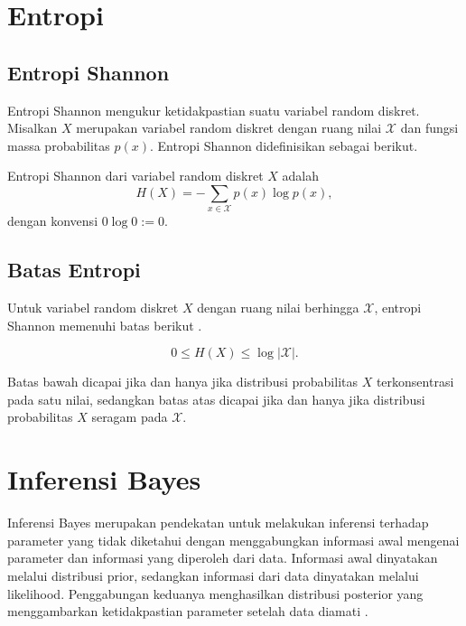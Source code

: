\section{Entropi}
\label{sec:entropi}

\subsection{Entropi Shannon}
\label{subsec:entropishannon}

Entropi Shannon mengukur ketidakpastian suatu variabel random
diskret. Misalkan $X$ merupakan variabel random diskret dengan
ruang nilai $\mathcal{X}$ dan fungsi massa probabilitas $p(x)$.
Entropi Shannon didefinisikan sebagai berikut.

\begin{definisi}
\label{def:entropishannon}
Entropi Shannon dari variabel random diskret $X$ adalah
\begin{equation}
    H(X)=-\sum_{x\in\mathcal{X}}p(x)\log p(x),
    \label{eq:entropishannon}
\end{equation}
dengan konvensi $0\log 0:=0$.
\end{definisi}

\subsection{Batas Entropi}
\label{subsec:batasentropi}

Untuk variabel random diskret $X$ dengan ruang nilai berhingga
$\mathcal{X}$, entropi Shannon memenuhi batas berikut
\citep{cover}.

\begin{equation}
    0\leq H(X)\leq\log|\mathcal{X}|.
    \label{eq:batasentropi}
\end{equation}

Batas bawah dicapai jika dan hanya jika distribusi probabilitas
$X$ terkonsentrasi pada satu nilai, sedangkan batas atas dicapai
jika dan hanya jika distribusi probabilitas $X$ seragam pada
$\mathcal{X}$.


\section{Inferensi Bayes}
\label{sec:bayes}

Inferensi Bayes merupakan pendekatan untuk melakukan inferensi terhadap
parameter yang tidak diketahui dengan menggabungkan informasi awal
mengenai parameter dan informasi yang diperoleh dari data. Informasi
awal dinyatakan melalui distribusi prior, sedangkan informasi dari data
dinyatakan melalui likelihood. Penggabungan keduanya menghasilkan
distribusi posterior yang menggambarkan ketidakpastian parameter setelah
data diamati \citep{casella}.

